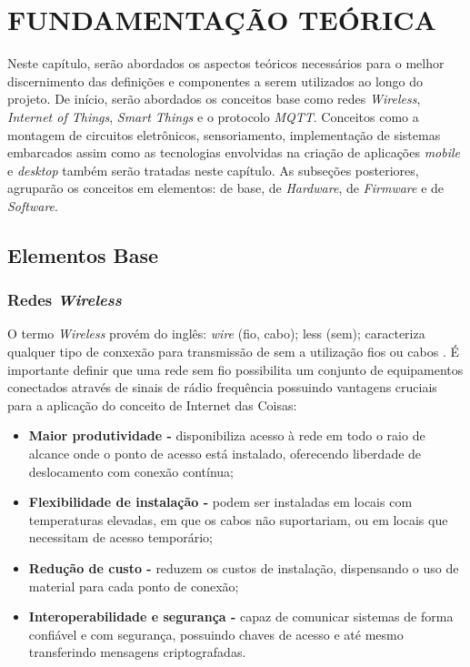 
\chapter{FUNDAMENTAÇÃO TEÓRICA}
\label{chap:fundamentacao-teorica}

Neste capítulo, serão abordados os aspectos teóricos necessários para o melhor discernimento das definições e componentes a serem utilizados ao longo do projeto. De início, serão abordados os conceitos base como redes \textit{Wireless}, \textit{Internet of Things}, \textit{Smart Things} e o protocolo \textit{MQTT}. Conceitos como a montagem de circuitos eletrônicos, sensoriamento, implementação de sistemas embarcados assim como as tecnologias envolvidas na criação de aplicações \textit{mobile} e \textit{desktop} também serão tratadas neste capítulo. As subseções posteriores, agruparão os conceitos em elementos: de base, de \textit{Hardware},  de \textit{Firmware} e de \textit{Software}.  

\section{Elementos Base}

\subsection{Redes \textit{Wireless}}

O termo \textit{Wireless} provém do inglês: \textit{wire} (fio, cabo); less (sem); caracteriza qualquer tipo de conxexão para transmissão de sem a utilização fios ou cabos \cite{redeswireless}. É importante definir que uma rede sem fio possibilita um conjunto de equipamentos conectados através de sinais de rádio frequência possuindo vantagens cruciais para a aplicação do conceito de Internet das Coisas:

\begin{itemize}
	\item \textbf{Maior produtividade - } disponibiliza acesso à rede em todo o raio de alcance onde o ponto de acesso está instalado, oferecendo liberdade de deslocamento com conexão contínua;
	
	\item \textbf{Flexibilidade de instalação -} podem ser instaladas em locais com temperaturas elevadas, em que os cabos não suportariam, ou em locais que necessitam de acesso temporário;
	
	\item \textbf{Redução de custo - } reduzem os custos de instalação, dispensando o uso de material para cada ponto de conexão;
	
	\item \textbf{Interoperabilidade e segurança - } capaz de comunicar sistemas de forma confiável e com segurança, possuindo chaves de acesso e até mesmo transferindo mensagens criptografadas.   

\end{itemize}

